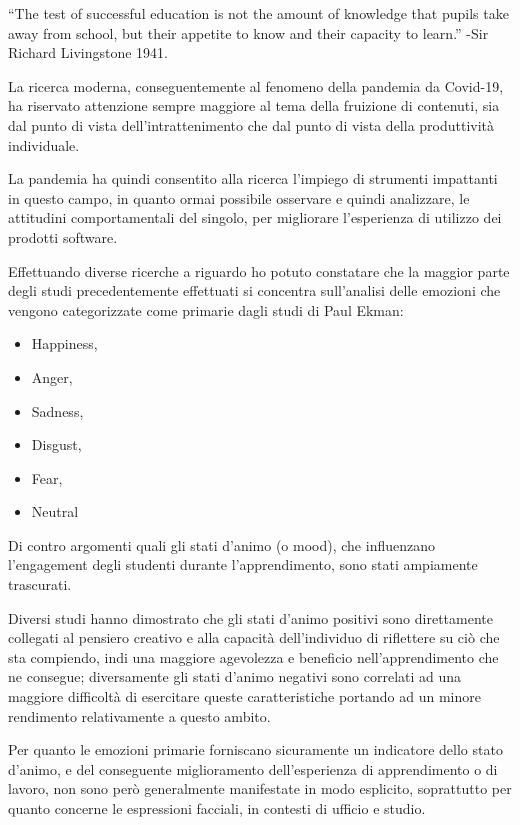 \begin{preface}
    “The test of successful education is not the amount of knowledge that pupils take away from school, but their appetite to know and their capacity to learn.” 
    -Sir Richard Livingstone 1941. \cite{Livingstone}
    
    La ricerca moderna, conseguentemente al fenomeno della pandemia da Covid-19, ha riservato attenzione sempre maggiore al tema della fruizione di contenuti, sia dal punto di vista dell’intrattenimento che dal punto di vista della produttività individuale.
    
    La pandemia ha quindi consentito alla ricerca l’impiego di strumenti impattanti in questo campo, in quanto ormai possibile osservare e quindi analizzare, le attitudini comportamentali del singolo, per migliorare l’esperienza di utilizzo dei prodotti software.
    
    Effettuando diverse ricerche a riguardo ho potuto constatare che la maggior parte degli studi precedentemente effettuati si concentra sull’analisi delle emozioni che vengono categorizzate come primarie dagli studi di Paul Ekman:
    \begin{itemize}
        \item Happiness,
        \item Anger,
        \item Sadness,
        \item Disgust,
        \item Fear,
        \item Neutral
    \end{itemize}
    
    Di contro argomenti quali gli stati d’animo (o mood), che influenzano l’engagement degli studenti durante l’apprendimento, sono stati ampiamente trascurati.
    
    Diversi studi hanno dimostrato che gli stati d’animo positivi sono direttamente collegati al pensiero creativo e alla capacità dell’individuo di riflettere su ciò che sta compiendo, indi una maggiore agevolezza e beneficio nell’apprendimento che ne consegue; diversamente gli stati d’animo negativi sono correlati ad una maggiore difficoltà di esercitare queste caratteristiche portando ad un minore rendimento relativamente a questo ambito.
    
    Per quanto le emozioni primarie forniscano sicuramente un indicatore dello stato d’animo, e del conseguente miglioramento dell’esperienza di apprendimento o di lavoro, non sono però generalmente manifestate in modo esplicito, soprattutto per quanto concerne le espressioni facciali, in contesti di ufficio e studio.
    

\end{preface}
